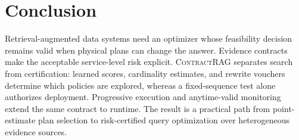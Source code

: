 \documentclass[sigconf,nonacm]{acmart}
\newcommand{\system}{\textsc{ContractRAG}\xspace}
\begin{document}
\section{Conclusion}
\label{sec:conclusion}
Retrieval-augmented data systems need an optimizer whose feasibility
decision remains valid when physical plans can change the answer.
Evidence contracts make the acceptable service-level risk explicit.
\system separates search from certification: learned scores, cardinality
estimates, and rewrite vouchers determine which policies are explored,
whereas a fixed-sequence test alone authorizes deployment. Progressive
execution and anytime-valid monitoring extend the same contract to
runtime. The result is a practical path from point-estimate plan selection
to risk-certified query optimization over heterogeneous evidence sources.



\end{document}
